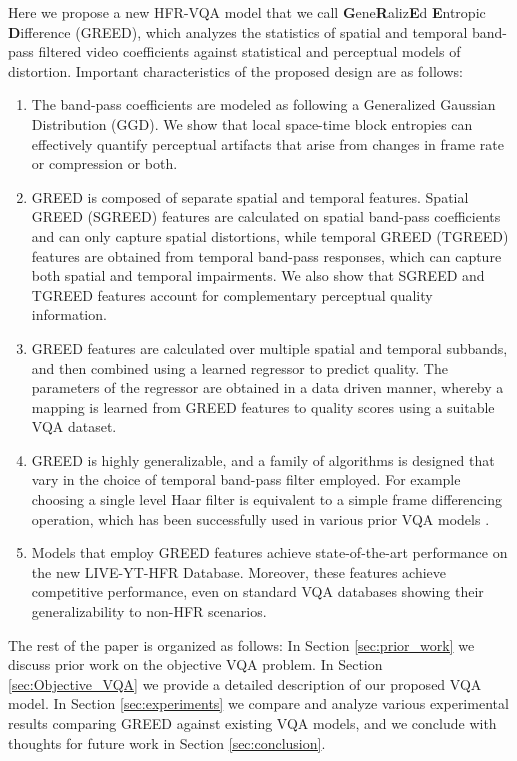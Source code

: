 \documentclass[journal]{IEEEtran}
\begin{document}
Here we propose a new HFR-VQA model that we call \textbf{G}ene\textbf{R}aliz\textbf{E}d \textbf{E}ntropic \textbf{D}ifference (GREED), which analyzes the statistics of spatial and temporal band-pass filtered video coefficients against statistical and perceptual models of distortion. Important characteristics of the proposed design are as follows:
\begin{enumerate}
    \item The band-pass coefficients are modeled as following a Generalized Gaussian Distribution (GGD). We show that local space-time block entropies can effectively quantify perceptual artifacts that arise from changes in frame rate or compression or both. 
    \item GREED is composed of separate spatial and temporal features. Spatial GREED (SGREED) features are calculated on spatial band-pass coefficients and can only capture spatial distortions, while temporal GREED (TGREED) features are obtained from temporal band-pass responses, which can capture both spatial and temporal impairments. We also show that SGREED and TGREED features account for complementary perceptual quality information.
    \item GREED features are calculated over multiple spatial and temporal subbands, and then combined using a learned regressor to predict quality.  The parameters of the regressor are obtained in a data driven manner, whereby a mapping is learned from GREED features to quality scores using a suitable VQA dataset.
    \item GREED is highly generalizable, and a family of algorithms is designed that vary in the choice of temporal band-pass filter employed. For example choosing a single level Haar filter is equivalent to a simple frame differencing operation, which has been successfully used in various prior VQA models \cite{soundararajan2012video,VMAF2016,bampis2017speed,bampis2018spatiotemporal}.
    \item Models that employ GREED features achieve state-of-the-art performance on the new LIVE-YT-HFR Database. Moreover, these features achieve competitive performance, even on standard VQA databases showing their generalizability to non-HFR scenarios.
\end{enumerate}

The rest of the paper is organized as follows: In Section \ref{sec:prior_work} we discuss prior work on the objective VQA problem. In Section \ref{sec:Objective_VQA} we provide a detailed description of our proposed VQA model. In Section \ref{sec:experiments} we compare and analyze various experimental results comparing GREED against existing VQA models, and we conclude with thoughts for future work in Section \ref{sec:conclusion}.
\end{document}
